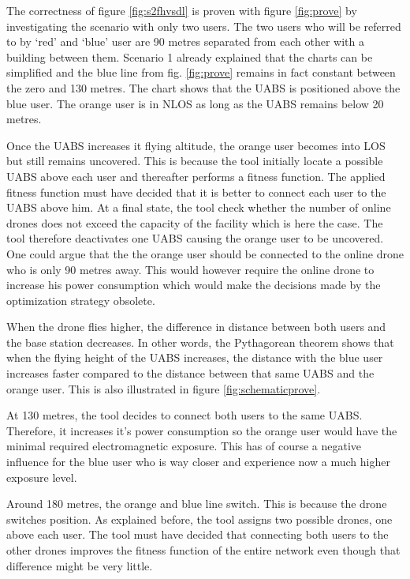 \newpage
The correctness of figure \ref{fig:s2fhvsdl} is proven with figure \ref{fig:prove} by investigating the scenario with only two users. The two users who 
will be referred to by `red' and `blue' user are 90 metres separated from each other with a building between them.
Scenario 1 already explained that the charts can be simplified and the blue line from fig. \ref{fig:prove} remains in fact constant between the zero and 130 metres.
The chart shows that the \gls{UABS} is positioned above the blue user. The orange user is in \gls{NLOS} as long as the \gls{UABS} remains below 20 metres.

Once the \gls{UABS} increases it flying altitude, the orange user becomes into \gls{LOS} but still remains uncovered. This is because the tool initially locate a possible 
\gls{UABS} above each user and thereafter performs a  fitness function. The applied fitness function must have decided that it is better to connect 
each user to the \gls{UABS} above him. At a final state, the tool check whether the number of online drones does not exceed the capacity of the facility
which is here the case. The tool therefore deactivates one \gls{UABS} causing the orange user to be uncovered. One could argue that the 
the orange user should be connected to the online drone who is only 90 metres away. This would however require the online drone to increase his power consumption which 
would make the decisions made by the optimization strategy obsolete.

When the drone flies higher, the difference in distance between both users and the base station decreases. In other words, the Pythagorean theorem shows that when the flying height of the 
\gls{UABS} increases, the distance with the blue user increases faster compared to the distance between that same \gls{UABS} and the orange user. This is also illustrated in figure \ref{fig:schematicprove}.

At 130 metres, the tool decides to connect both users to the same UABS. Therefore, it increases it's power consumption so the orange user would  have the minimal 
required electromagnetic exposure. This has of course a negative influence for the blue user who is way closer and experience now a much higher exposure level.

Around 180 metres, the  orange and blue line switch. This is because the drone switches position. As explained before, the tool assigns two possible drones, one above 
each user. The tool must have decided that connecting both users to the other drones improves the fitness function of the entire network even though that difference might be 
very little.



